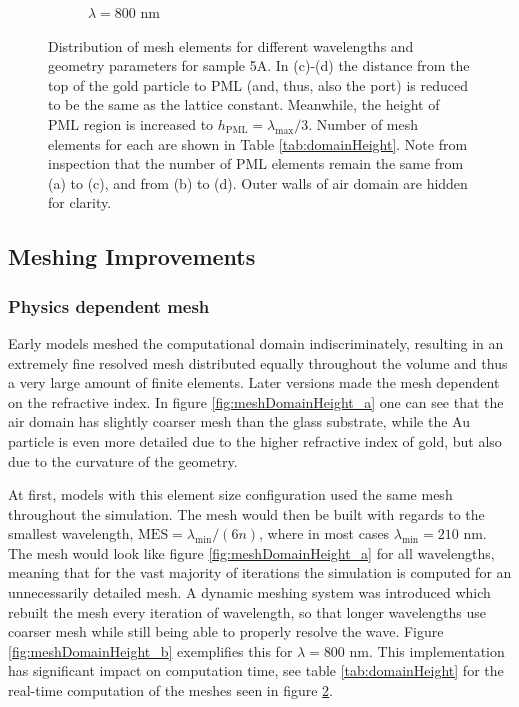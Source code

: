 \begin{figure}[htb]
\begin{subfigure}{.2\textwidth}
        \caption{$\lambda=800$ nm}
        \label{fig:meshDomainHeight_d}
    \end{subfigure}
    \caption{Distribution of mesh elements for different wavelengths and geometry parameters for sample 5A. In (c)-(d) the distance from the top of the gold particle to PML (and, thus, also the port) is reduced to be the same as the lattice constant. Meanwhile, the height of PML region is increased to $h_{\text{PML}}=\lambda_{\text{max}}/3$. Number of mesh elements for each are shown in Table \ref{tab:domainHeight}. Note from inspection that the number of PML elements remain the same from (a) to (c), and from (b) to (d). Outer walls of air domain are hidden for clarity.}
    \label{fig:meshDomainHeight}
\end{figure}

\subsection{Meshing Improvements}
\label{sec:optimization_mesh}
\subsubsection{Physics dependent mesh}
Early models meshed the computational domain indiscriminately, resulting in an extremely fine resolved mesh distributed equally throughout the volume and thus a very large amount of finite elements. Later versions made the mesh dependent on the refractive index. In figure \ref{fig:meshDomainHeight_a} one can see that the air domain has slightly coarser mesh than the glass substrate, while the Au particle is even more detailed due to the higher refractive index of gold, but also due to the curvature of the geometry. 

At first, models with this element size configuration used the same mesh throughout the simulation. The mesh would then be built with regards to the smallest wavelength, $\text{MES}=\lambda_{\text{min}}/(6n)$, where in most cases $\lambda_{\text{min}}=210$ nm. The mesh would look like figure \ref{fig:meshDomainHeight_a} for all wavelengths, meaning that for the vast majority of iterations the simulation is computed for an unnecessarily detailed mesh. A dynamic meshing system was introduced which rebuilt the mesh every iteration of wavelength, so that longer wavelengths use coarser mesh while still being able to properly resolve the wave. Figure \ref{fig:meshDomainHeight_b} exemplifies this for $\lambda=800$ nm. This implementation has significant impact on computation time, see table \ref{tab:domainHeight} for the real-time computation of the meshes seen in figure \ref{fig:meshDomainHeight}. 

